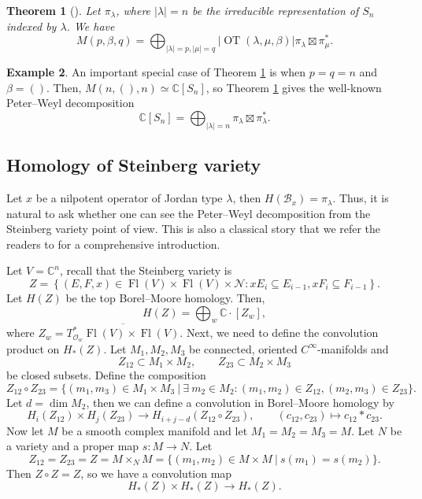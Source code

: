 \documentclass[12pt,a4paper]{article}
\def\Fl{\operatorname{Fl}}
\def\FlVV{\Fl(V) \times \Fl(V)}
\theoremstyle{plain}
\newtheorem{thm}{Theorem}[section]
\theoremstyle{definition}
\newtheorem{example}[thm]{Example}
\theoremstyle{remark}
\newcommand{\OT}{\operatorname{OT}}
\newcommand{\cB}{\mathcal{B}}
\newcommand{\cN}{\mathcal{N}}
\newcommand{\cO}{\mathcal{O}}
\newcommand{\CC}{\mathbb{C}}
\begin{document}
    \begin{thm}[{\cite[Theorem 3.1]{pak1996oscillating}}]\label{thm:PPrep}
        Let $\pi_\lambda$, where $|\lambda| = n$ be the irreducible representation of $S_n$ indexed by $\lambda$. We have
        \[
        M(p,\beta,q) = \bigoplus_{|\lambda| = p,|\mu| = q} |\OT(\lambda,\mu,\beta)| \pi_\lambda \boxtimes \pi^*_\mu.
        \]
    \end{thm}

    \begin{example}\label{ex:PPrep-pp}
        An important special case of Theorem \ref{thm:PPrep} is when $p = q = n$ and $\beta = ()$. Then, $M(n,(),n) \simeq \CC[S_n]$, so Theorem \ref{thm:PPrep} gives the well-known Peter--Weyl decomposition
        \[
        \CC[S_n] = \bigoplus_{|\lambda| = n}\pi_\lambda \boxtimes \pi^*_\lambda.
        \]
    \end{example}

\subsection{Homology of Steinberg variety}\label{subsec:convo-hom-st}

    Let $x$ be a nilpotent operator of Jordan type $\lambda$, then $H(\cB_x) = \pi_\lambda$. Thus, it is natural to ask whether one can see the Peter--Weyl decomposition from the Steinberg variety point of view. This is also a classical story that we refer the readers to \cite[Section 3]{chriss1997representation} for a comprehensive introduction.

    Let $V = \CC^n$, recall that the Steinberg variety is
    \[
    Z = \left\{(E,F,x)\in \FlVV \times\cN: xE_i \subseteq E_{i-1}, xF_i\subseteq F_{i-1}\right\}.
    \]
    Let $H(Z)$ be the top Borel--Moore homology. Then,
    \[
    H(Z) = \bigoplus_w \CC\cdot[Z_w],
    \]
    where $Z_w = \overline{T^*_{\cO_w}\FlVV}$. Next, we need to define the convolution product on $H_*(Z)$. Let $M_1,M_2,M_3$ be connected, oriented $C^\infty$-manifolds and
    \[
    Z_{12} \subset M_1\times M_2,\qquad Z_{23} \subset M_2\times M_3
    \]
    be closed subsets. Define the composition
    \[
    Z_{12}\circ Z_{23} = \{(m_1,m_3) \in M_1\times M_3~|~\exists~ m_2\in M_2:(m_1,m_2) \in Z_{12}, (m_2,m_3) \in Z_{23}\}.
    \]
    Let $d = \dim M_2$, then we can define a convolution in Borel--Moore homology by
    \[
    H_i(Z_{12})\times H_j(Z_{23}) \longrightarrow H_{i+j-d}(Z_{12}\circ Z_{23}), \qquad (c_{12},c_{23}) \mapsto c_{12}\ast c_{23}.
    \]
    Now let $M$ be a smooth complex manifold and let $M_1 = M_2 = M_3 = M$. Let $N$ be a variety and a proper map $s:M \rightarrow N$. Let
    \[
    Z_{12} = Z_{23} = Z = M\times_N M = \{(m_1,m_2) \in M\times M~|~s(m_1) = s(m_2)\}.
    \]
    Then $Z\circ Z = Z$, so we have a convolution map
    \[
    H_*(Z)\times H_*(Z) \longrightarrow H_*(Z).
    \]
\end{document}
